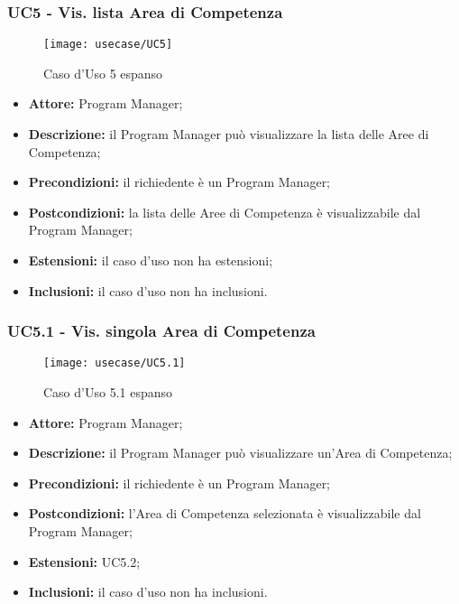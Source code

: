 \subsubsection*{UC5 - Vis. lista Area di Competenza}
\begin{figure}[H] 
    \centering 
    \texttt{[image: usecase/UC5]} 
    \caption{Caso d'Uso 5 espanso}
\end{figure}
\begin{itemize}[label=$\circ$]
\item \textbf{Attore:} Program Manager;
\item \textbf{Descrizione:} il Program Manager può visualizzare la lista delle Aree di Competenza;
\item \textbf{Precondizioni:} il richiedente è un Program Manager;
\item \textbf{Postcondizioni:} la lista delle Aree di Competenza è visualizzabile dal Program Manager;
\item \textbf{Estensioni:} il caso d'uso non ha estensioni;
\item \textbf{Inclusioni:} il caso d'uso non ha inclusioni.
\end{itemize}

\subsubsection*{UC5.1 - Vis. singola Area di Competenza}
\begin{figure}[H] 
    \centering 
    \texttt{[image: usecase/UC5.1]} 
    \caption{Caso d'Uso 5.1 espanso}
\end{figure}
\begin{itemize}[label=$\circ$]
\item \textbf{Attore:} Program Manager;
\item \textbf{Descrizione:} il Program Manager può visualizzare un'Area di Competenza;
\item \textbf{Precondizioni:} il richiedente è un Program Manager;
\item \textbf{Postcondizioni:} l'Area di Competenza selezionata è visualizzabile dal Program Manager;
\item \textbf{Estensioni:}  UC5.2;
\item \textbf{Inclusioni:} il caso d'uso non ha inclusioni.
\end{itemize}

